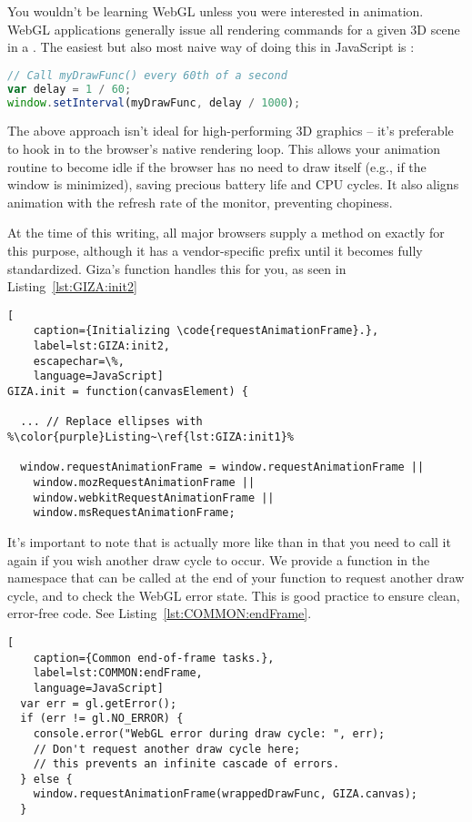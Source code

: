 You wouldn't be learning WebGL unless you were interested in animation.  WebGL applications generally issue all rendering commands for a given 3D scene in a .  The easiest but also most naive way of doing this in JavaScript is :

\begin{lstlisting}[language=JavaScript]
// Call myDrawFunc() every 60th of a second
var delay = 1 / 60;
window.setInterval(myDrawFunc, delay / 1000);
\end{lstlisting}

The above approach isn't ideal for high-performing 3D graphics -- it's preferable to hook in to the browser's native rendering loop.  This allows your animation routine to become idle if the browser has no need to draw itself (e.g., if the window is minimized), saving precious battery life and CPU cycles.  It also aligns animation with the refresh rate of the monitor, preventing chopiness.

At the time of this writing, all major browsers supply a method on  exactly for this purpose, although it has a vendor-specific prefix until it becomes fully standardized.  Giza's  function handles this for you, as seen in Listing~\ref{lst:GIZA:init2}

\begin{lstlisting}[
    caption={Initializing \code{requestAnimationFrame}.},
    label=lst:GIZA:init2,
    escapechar=\%,
    language=JavaScript]
GIZA.init = function(canvasElement) {

  ... // Replace ellipses with %\color{purple}Listing~\ref{lst:GIZA:init1}%

  window.requestAnimationFrame = window.requestAnimationFrame ||
    window.mozRequestAnimationFrame ||
    window.webkitRequestAnimationFrame ||
    window.msRequestAnimationFrame;
\end{lstlisting} 

It's important to note that  is actually more like  than  in that you need to call it again if you wish another draw cycle to occur.  We provide a function in the  namespace that can be called at the end of your function to request another draw cycle, and to check the WebGL error state.  This is good practice to ensure clean, error-free code.  See Listing~\ref{lst:COMMON:endFrame}.

\begin{lstlisting}[
    caption={Common end-of-frame tasks.},
    label=lst:COMMON:endFrame,
    language=JavaScript]
  var err = gl.getError();
  if (err != gl.NO_ERROR) {
    console.error("WebGL error during draw cycle: ", err);
    // Don't request another draw cycle here;
    // this prevents an infinite cascade of errors.
  } else {
    window.requestAnimationFrame(wrappedDrawFunc, GIZA.canvas);
  }
\end{lstlisting} 

